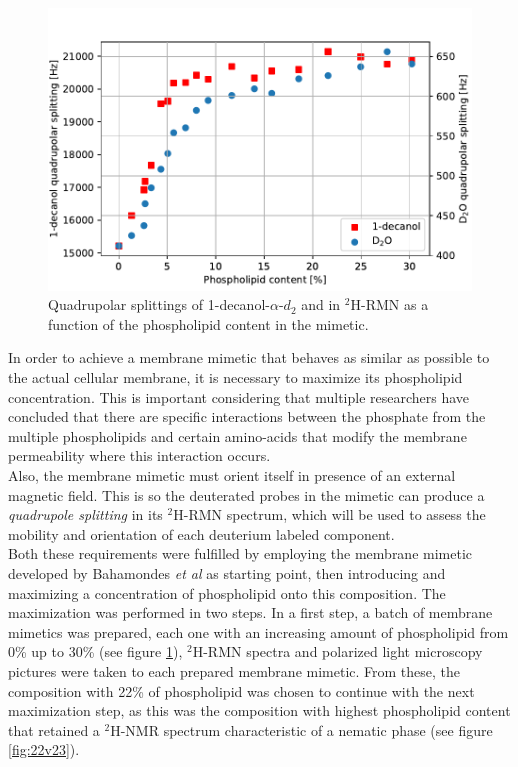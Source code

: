 \documentclass[9pt]{article}
\begin{document}
\begin{figure}[h]
\centering
  \includegraphics[width=\columnwidth]{splitting_v_phospholipid}
  \caption{Quadrupolar splittings of 1-decanol-$\alpha$-$d_2$ and  in
    $^2$H-RMN as a function of the phospholipid content in the mimetic.}
  \label{fig:1st_max}
\end{figure}

In order to achieve a membrane mimetic that behaves as similar as possible to
the actual cellular membrane, it is necessary to maximize its phospholipid
concentration. This is important considering that multiple researchers have
concluded that there are specific interactions between the phosphate from the
multiple phospholipids and certain amino-acids that modify the membrane
permeability where this interaction occurs.\\
Also, the membrane mimetic must orient itself in presence of an external
magnetic field. This is so the deuterated probes in the mimetic can produce a
\textit{quadrupole splitting} in its $^2$H-RMN spectrum, which will be used to
assess the mobility and orientation of each deuterium labeled component.\\
Both these requirements were fulfilled by employing the membrane mimetic
developed by Bahamondes \textit{et al} as starting point,
then introducing and maximizing a concentration of phospholipid onto this
composition. The maximization was performed in two steps. In a first step, a
batch of membrane mimetics was prepared, each one with an increasing amount of
phospholipid from 0\% up to 30\% (see figure \ref{fig:1st_max}), $^2$H-RMN
spectra and polarized light microscopy pictures were taken to each prepared
membrane mimetic. From these, the composition with 22\% of phospholipid was
chosen to continue with the next maximization step, as this was the composition
with highest phospholipid content that retained a $^2$H-NMR spectrum
characteristic of a nematic phase (see figure \ref{fig:22v23}).
\end{document}
